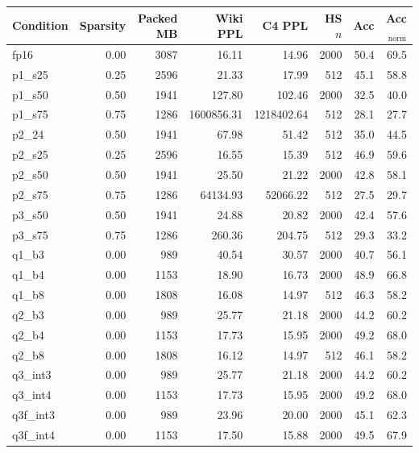 \begin{tabular}{lrrrrrrr}
\toprule
Condition & Sparsity & Packed MB & Wiki PPL & C4 PPL & HS $n$ & Acc & Acc$_{\mathrm{norm}}$ \\
\midrule
fp16 & 0.00 & 3087 & 16.11 & 14.96 & 2000 & 50.4 & 69.5 \\
p1\_s25 & 0.25 & 2596 & 21.33 & 17.99 & 512 & 45.1 & 58.8 \\
p1\_s50 & 0.50 & 1941 & 127.80 & 102.46 & 2000 & 32.5 & 40.0 \\
p1\_s75 & 0.75 & 1286 & 1600856.31 & 1218402.64 & 512 & 28.1 & 27.7 \\
p2\_24 & 0.50 & 1941 & 67.98 & 51.42 & 512 & 35.0 & 44.5 \\
p2\_s25 & 0.25 & 2596 & 16.55 & 15.39 & 512 & 46.9 & 59.6 \\
p2\_s50 & 0.50 & 1941 & 25.50 & 21.22 & 2000 & 42.8 & 58.1 \\
p2\_s75 & 0.75 & 1286 & 64134.93 & 52066.22 & 512 & 27.5 & 29.7 \\
p3\_s50 & 0.50 & 1941 & 24.88 & 20.82 & 2000 & 42.4 & 57.6 \\
p3\_s75 & 0.75 & 1286 & 260.36 & 204.75 & 512 & 29.3 & 33.2 \\
q1\_b3 & 0.00 & 989 & 40.54 & 30.57 & 2000 & 40.7 & 56.1 \\
q1\_b4 & 0.00 & 1153 & 18.90 & 16.73 & 2000 & 48.9 & 66.8 \\
q1\_b8 & 0.00 & 1808 & 16.08 & 14.97 & 512 & 46.3 & 58.2 \\
q2\_b3 & 0.00 & 989 & 25.77 & 21.18 & 2000 & 44.2 & 60.2 \\
q2\_b4 & 0.00 & 1153 & 17.73 & 15.95 & 2000 & 49.2 & 68.0 \\
q2\_b8 & 0.00 & 1808 & 16.12 & 14.97 & 512 & 46.1 & 58.2 \\
q3\_int3 & 0.00 & 989 & 25.77 & 21.18 & 2000 & 44.2 & 60.2 \\
q3\_int4 & 0.00 & 1153 & 17.73 & 15.95 & 2000 & 49.2 & 68.0 \\
q3f\_int3 & 0.00 & 989 & 23.96 & 20.00 & 2000 & 45.1 & 62.3 \\
q3f\_int4 & 0.00 & 1153 & 17.50 & 15.88 & 2000 & 49.5 & 67.9 \\
\bottomrule
\end{tabular}
